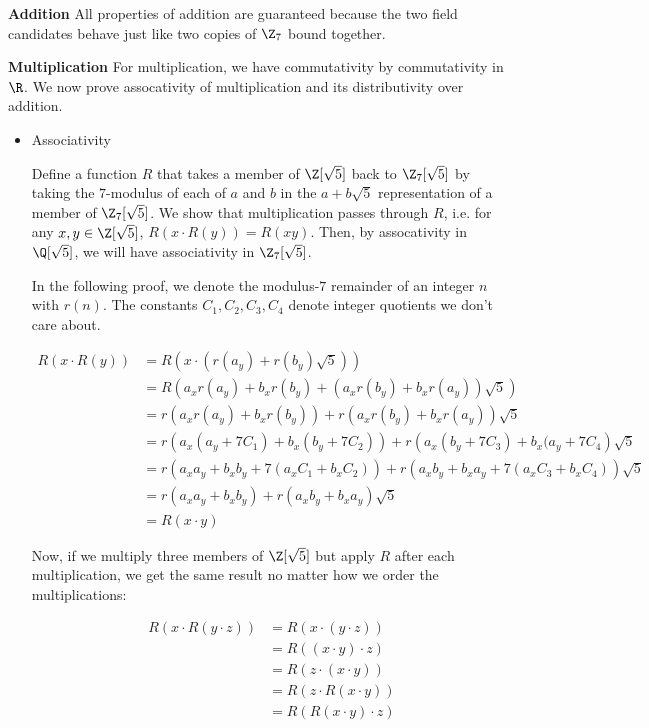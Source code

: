 
  \textbf{Addition} All properties of addition are guaranteed because the two field candidates behave just like two copies of $\Z_7$ bound together.

  \textbf{Multiplication} For multiplication, we have commutativity by commutativity in $\R$. We now prove assocativity of multiplication and its distributivity over addition.

  \begin{itemize}
    \item Associativity

    Define a function $R$ that takes a member of $\Z[\sqrt 5]$ back to $\Z_7[\sqrt5]$ by taking the $7$-modulus of each of $a$ and $b$ in the $a+b\sqrt5$ representation of a member of $\Z_7[\sqrt5]$. We show that multiplication passes through $R$, i.e. for any $x,y \in \Z[\sqrt5]$, $R(x \cdot R(y)) = R(xy)$. Then, by assocativity in $\Q[\sqrt5]$, we will have associativity in $\Z_7[\sqrt5]$.
    
    In the following proof, we denote the modulus-$7$ remainder of an integer $n$ with $r(n)$. The constants $C_1, C_2, C_3, C_4$ denote integer quotients we don't care about.

    \begin{align*}
      R(x\cdot R(y)) &= R(x \cdot (r(a_y) + r(b_y)\sqrt 5))\\
      &= R(a_x r(a_y) + b_xr(b_y) + (a_x r(b_y) + b_x r(a_y))\sqrt5)\\
      &= r(a_x r(a_y) + b_xr(b_y)) + r\left(
        a_x r(b_y) + b_x r(a_y)
        \right)\sqrt5\\
      &= r(a_x (a_y + 7C_1) + b_x (b_y + 7C_2)) + r\left(a_x (b_y + 7C_3) + b_x (a_y + 7C_4\right)\sqrt5\\
      &= r(a_x a_y + b_x b_y + 7(a_xC_1 + b_xC_2)) + r\left(a_xb_y + b_x a_y + 7(a_x C_3 + b_x C_4)\right)\sqrt5\\
      &= r(a_x a_y + b_x b_y) + r(a_x b_y + b_x a_y) \sqrt5\\
      &= R(x\cdot y)
    \end{align*}

    Now, if we multiply three members of $\Z[\sqrt5]$ but apply $R$ after each multiplication, we get the same result no matter how we order the multiplications:

    \begin{align*}
      R(x\cdot R(y\cdot z)) &= R(x\cdot(y\cdot z))\\
      &= R((x\cdot y)\cdot z) \\
      &= R(z\cdot (x\cdot y))\\
      &= R(z\cdot R(x\cdot y))\\
      &= R(R(x\cdot y)\cdot z)
    \end{align*}


\end{itemize}
